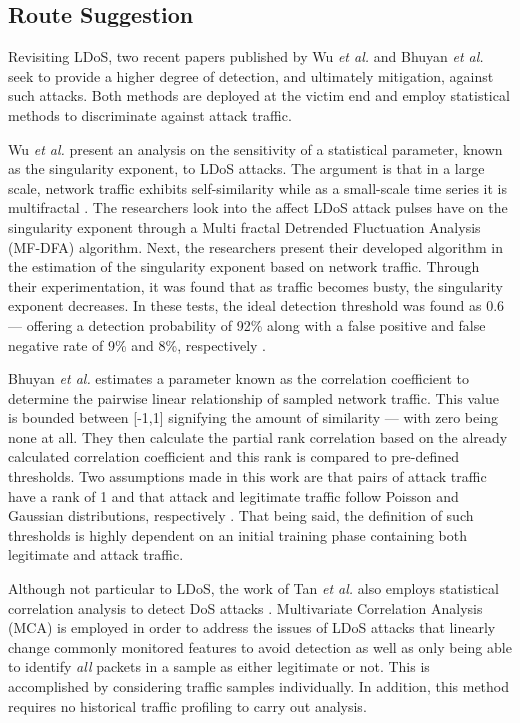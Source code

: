 \documentclass[conference]{IEEEtran}
\begin{document}
\subsection{Route Suggestion}
Revisiting LDoS, two recent papers published by Wu \textit{et al.} \cite{Wu:LDoSMultifractal} and Bhuyan \textit{et al.} \cite{Bhuyan:partialRank} seek to provide a higher degree of detection, and ultimately mitigation, against such attacks. Both methods are deployed at the victim end and employ statistical methods to discriminate against attack traffic.

Wu \textit{et al.} present an analysis on the sensitivity of a statistical parameter, known as the singularity exponent, to LDoS attacks. The argument is that in a large scale, network traffic exhibits self-similarity while as a small-scale time series it is multifractal \cite{Wu:LDoSMultifractal}. The researchers look into the affect LDoS attack pulses have on the singularity exponent through a Multi fractal Detrended Fluctuation Analysis (MF-DFA) algorithm. Next, the researchers present their developed algorithm in the estimation of the singularity exponent based on network traffic. Through their experimentation, it was found that as traffic becomes busty, the singularity exponent decreases. In these tests, the ideal detection threshold was found as 0.6 --- offering a detection probability of 92\% along with a false positive and false negative rate of 9\% and 8\%, respectively \cite{Wu:LDoSMultifractal}.

Bhuyan \textit{et al.} estimates a parameter known as the correlation coefficient to determine the pairwise linear relationship of sampled network traffic. This value is bounded between [-1,1] signifying the amount of similarity --- with zero being none at all. They then calculate the partial rank correlation based on the already calculated correlation coefficient and this rank is compared to pre-defined thresholds. Two assumptions made in this work are that pairs of attack traffic have a rank of 1 and that attack and legitimate traffic follow Poisson and Gaussian distributions, respectively \cite{Bhuyan:partialRank}. That being said, the definition of such thresholds is highly dependent on an initial training phase containing both legitimate and attack traffic.

Although not particular to LDoS, the work of Tan \textit{et al.} also employs statistical correlation analysis to detect DoS attacks \cite{Tan:MCA}. Multivariate Correlation Analysis (MCA) is employed in order to address the issues of LDoS attacks that linearly change commonly monitored features to avoid detection as well as only being able to identify \textit{all} packets in a sample as either legitimate or not. This is accomplished by considering traffic samples individually. In addition, this method requires no historical traffic profiling to carry out analysis.
\end{document}
